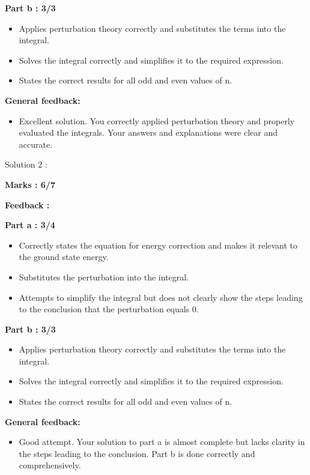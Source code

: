 \documentclass[a4paper,11pt]{article}
\begin{document}
\textbf{Part b : 3/3}

\begin{itemize}
    \item Applies perturbation theory correctly and substitutes the terms into the integral.
    \item Solves the integral correctly and simplifies it to the required expression.
    \item States the correct results for all odd and even values of n.
\end{itemize}

\textbf{General feedback:}

\begin{itemize}
    \item Excellent solution. You correctly applied perturbation theory and properly evaluated the integrals. Your answers and explanations were clear and accurate.
\end{itemize}



Solution 2 :

\textbf{Marks : 6/7}

\textbf{Feedback :}

\textbf{Part a : 3/4}

\begin{itemize}
    \item Correctly states the equation for energy correction and makes it relevant to the ground state energy.
    \item Substitutes the perturbation into the integral.
    \item Attempts to simplify the integral but does not clearly show the steps leading to the conclusion that the perturbation equals 0.
\end{itemize}


\textbf{Part b : 3/3}

\begin{itemize}
    \item Applies perturbation theory correctly and substitutes the terms into the integral.
    \item Solves the integral correctly and simplifies it to the required expression.
    \item States the correct results for all odd and even values of n.
\end{itemize}

\textbf{General feedback:}

\begin{itemize}
    \item Good attempt. Your solution to part a is almost complete but lacks clarity in the steps leading to the conclusion. Part b is done correctly and comprehensively.
\end{itemize}
\end{document}
